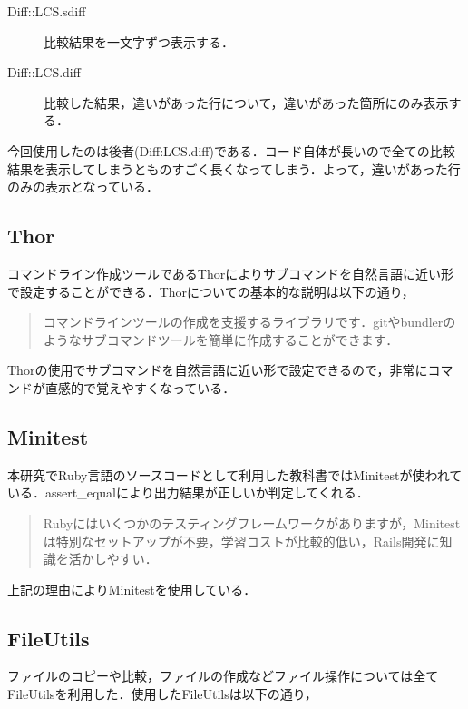 \begin{description}
\item[Diff::LCS.sdiff]
比較結果を一文字ずつ表示する．
\item[Diff::LCS.diff]
比較した結果，違いがあった行について，違いがあった箇所にのみ表示する．
\end{description}
今回使用したのは後者(Diff:LCS.diff)である．コード自体が長いので全ての比較結果を表示してしまうとものすごく長くなってしまう．よって，違いがあった行のみの表示となっている．

    \subsection{Thor}\label{thor}

    コマンドライン作成ツールであるThorによりサブコマンドを自然言語に近い形で設定することができる．Thorについての基本的な説明は以下の通り，
\begin{quotation}
コマンドラインツールの作成を支援するライブラリです．gitやbundlerのようなサブコマンドツールを簡単に作成することができます． \cite{thor}
\end{quotation}
Thorの使用でサブコマンドを自然言語に近い形で設定できるので，非常にコマンドが直感的で覚えやすくなっている．

    \subsection{Minitest}\label{minitest}

    本研究でRuby言語のソースコードとして利用した教科書ではMinitestが使われている．assert\_equalにより出力結果が正しいか判定してくれる．
\begin{quotation}    
    Rubyにはいくつかのテスティングフレームワークがありますが，Minitestは特別なセットアップが不要，学習コストが比較的低い，Rails開発に知識を活かしやすい\cite{book}．
\end{quotation}    
上記の理由によりMinitestを使用している．

    \subsection{FileUtils}\label{fileutils}

ファイルのコピーや比較，ファイルの作成などファイル操作については全てFileUtilsを利用した．使用したFileUtilsは以下の通り，

